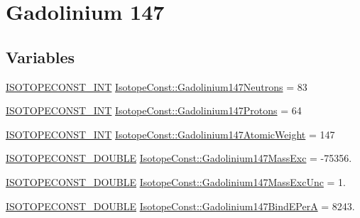 \hypertarget{group___isotope_const-_gadolinium-_gd147}{}\section{Gadolinium 147}
\label{group___isotope_const-_gadolinium-_gd147}
\subsection*{Variables}
\begin{DoxyCompactItemize}
\item 
\mbox{\hyperlink{group___isotope_const-_macros_ga5f18360b3e99483a35c32d789e62621c}{I\+S\+O\+T\+O\+P\+E\+C\+O\+N\+S\+T\+\_\+\+I\+NT}} \mbox{\hyperlink{group___isotope_const-_gadolinium-_gd147_ga1e72705b0a6b74f9c20c92cad7e07263}{Isotope\+Const\+::\+Gadolinium147\+Neutrons}} = 83
\item 
\mbox{\hyperlink{group___isotope_const-_macros_ga5f18360b3e99483a35c32d789e62621c}{I\+S\+O\+T\+O\+P\+E\+C\+O\+N\+S\+T\+\_\+\+I\+NT}} \mbox{\hyperlink{group___isotope_const-_gadolinium-_gd147_ga2a51923652403c8141613e8799838635}{Isotope\+Const\+::\+Gadolinium147\+Protons}} = 64
\item 
\mbox{\hyperlink{group___isotope_const-_macros_ga5f18360b3e99483a35c32d789e62621c}{I\+S\+O\+T\+O\+P\+E\+C\+O\+N\+S\+T\+\_\+\+I\+NT}} \mbox{\hyperlink{group___isotope_const-_gadolinium-_gd147_gaedc4f3ce2032b1fc06d3db75ed9b4ac9}{Isotope\+Const\+::\+Gadolinium147\+Atomic\+Weight}} = 147
\item 
\mbox{\hyperlink{group___isotope_const-_macros_ga8f45a7272ce02c0b4c65c44636ed719a}{I\+S\+O\+T\+O\+P\+E\+C\+O\+N\+S\+T\+\_\+\+D\+O\+U\+B\+LE}} \mbox{\hyperlink{group___isotope_const-_gadolinium-_gd147_gac6041ddc169ad7005f7d889c7e1cc539}{Isotope\+Const\+::\+Gadolinium147\+Mass\+Exc}} = -\/75356.
\item 
\mbox{\hyperlink{group___isotope_const-_macros_ga8f45a7272ce02c0b4c65c44636ed719a}{I\+S\+O\+T\+O\+P\+E\+C\+O\+N\+S\+T\+\_\+\+D\+O\+U\+B\+LE}} \mbox{\hyperlink{group___isotope_const-_gadolinium-_gd147_ga840b881da8590a5d3e7fb1d98f4f2de5}{Isotope\+Const\+::\+Gadolinium147\+Mass\+Exc\+Unc}} = 1.
\item 
\mbox{\hyperlink{group___isotope_const-_macros_ga8f45a7272ce02c0b4c65c44636ed719a}{I\+S\+O\+T\+O\+P\+E\+C\+O\+N\+S\+T\+\_\+\+D\+O\+U\+B\+LE}} \mbox{\hyperlink{group___isotope_const-_gadolinium-_gd147_ga466a77da3fa56205e655e0ad7b4e1b63}{Isotope\+Const\+::\+Gadolinium147\+Bind\+E\+PerA}} = 8243.

\end{DoxyCompactItemize}
